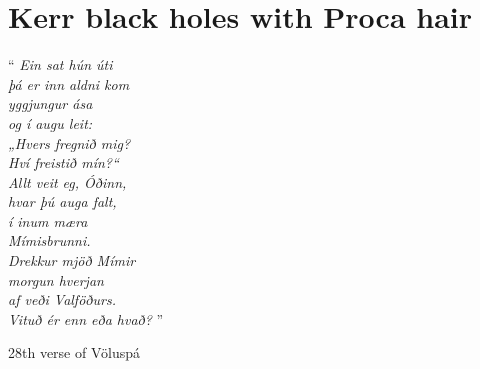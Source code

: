 \chapter{Kerr black holes with Proca hair}
\label{ch:proca}

\epigraph{``\emph{
Ein sat hún úti \\
þá er inn aldni kom \\
yggjungur ása \\
og í augu leit: \\
„Hvers fregnið mig? \\
Hví freistið mín?“ \\
Allt veit eg, Óðinn, \\
hvar þú auga falt, \\
í inum mæra \\
Mímisbrunni. \\
Drekkur mjöð Mímir \\
morgun hverjan \\
af veði Valföðurs. \\
Vituð ér enn eða hvað? 
} 
''}{28th verse of Völuspá}


